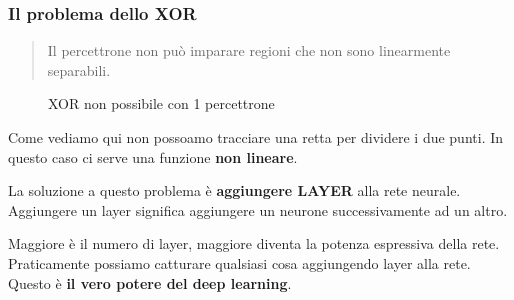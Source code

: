 \subsubsection{Il problema dello XOR}
\begin{quote}
    Il percettrone non può imparare regioni che non sono linearmente separabili.
\end{quote}

\begin{figure}[H]
    \begin{center}
        \caption{XOR non possibile con 1 percettrone}
    \end{center}

\end{figure}

Come vediamo qui non possoamo tracciare una retta per dividere i due punti. In
questo caso ci serve una funzione \textbf{non lineare}.

La soluzione a questo problema è \textbf{aggiungere LAYER} alla rete neurale.
Aggiungere un layer significa aggiungere un neurone successivamente ad un
altro.

Maggiore è il numero di layer, maggiore diventa la potenza espressiva della
rete. Praticamente possiamo catturare qualsiasi cosa aggiungendo layer alla
rete. Questo è \textbf{il vero potere del deep learning}.

